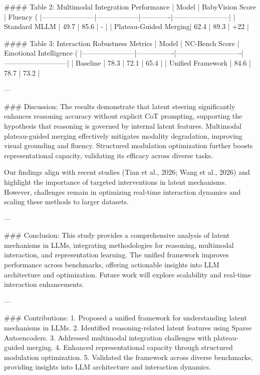#### Table 2: Multimodal Integration Performance
| Model                 | BabyVision Score | Fluency (%
|-----------------------|------------------|-------------|------------------------|
| Standard MLLM         | 49.7            | 85.6        | -                     |
| Plateau-Guided Merging| 62.4            | 89.3        | +22                   |

#### Table 3: Interaction Robustness Metrics
| Model                 | NC-Bench Score | Emotional Intelligence (%
|-----------------------|----------------|----------------------------|---------------------------|
| Baseline              | 78.3          | 72.1                       | 65.4                      |
| Unified Framework     | 84.6          | 78.7                       | 73.2                      |

---

### Discussion:
The results demonstrate that latent steering significantly enhances reasoning accuracy without explicit CoT prompting, supporting the hypothesis that reasoning is governed by internal latent features. Multimodal plateau-guided merging effectively mitigates modality degradation, improving visual grounding and fluency. Structured modulation optimization further boosts representational capacity, validating its efficacy across diverse tasks.

Our findings align with recent studies (Tian et al., 2026; Wang et al., 2026) and highlight the importance of targeted interventions in latent mechanisms. However, challenges remain in optimizing real-time interaction dynamics and scaling these methods to larger datasets.

---

### Conclusion:
This study provides a comprehensive analysis of latent mechanisms in LLMs, integrating methodologies for reasoning, multimodal interaction, and representation learning. The unified framework improves performance across benchmarks, offering actionable insights into LLM architecture and optimization. Future work will explore scalability and real-time interaction enhancements.

---

### Contributions:
1. Proposed a unified framework for understanding latent mechanisms in LLMs.
2. Identified reasoning-related latent features using Sparse Autoencoders.
3. Addressed multimodal integration challenges with plateau-guided merging.
4. Enhanced representational capacity through structured modulation optimization.
5. Validated the framework across diverse benchmarks, providing insights into LLM architecture and interaction dynamics.